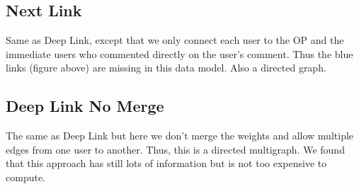 \subsection{Next Link}
Same as Deep Link, except that we only connect each user to the OP and the immediate users who commented directly on the user's comment. Thus the blue links (figure above) are missing in this data model. Also a directed graph.

\subsection{Deep Link No Merge}
The same as Deep Link but here we don't merge the weights and allow multiple edges from one user to another. Thus, this is a directed multigraph. We found that this approach has still lots of information but is not too expensive to compute.











